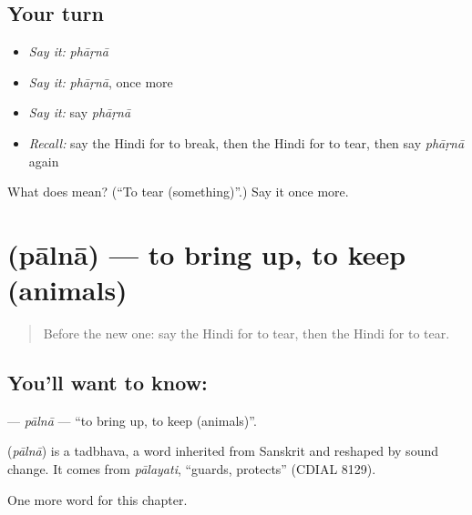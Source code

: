 \subsection*{Your turn}
\begin{itemize}
\raggedright
  \item \emph{Say it:} \emph{phāṛnā}
  \item \emph{Say it:} \emph{phāṛnā}, once more
  \item \emph{Say it:} say \emph{phāṛnā}
  \item \emph{Recall:} say the Hindi for to break, then the Hindi for to tear, then say \emph{phāṛnā} again
\end{itemize}

\begin{tcolorbox}[breakable,colback=teal!4,colframe=teal!35!black,title={Before you move on}]
What does  mean? (\textquotedblleft{}To tear (something)\textquotedblright{}.) Say it once more.
\end{tcolorbox}
\section[\texorpdfstring{\hi{पालना} (pālnā)}{पालना (pālnā)}]{ (pālnā) — to bring up, to keep (animals)}

\label{lesson:HI-C227-palna}



\begin{quote}
Before the new one: say the Hindi for to tear, then the Hindi for to tear.
\end{quote}

\subsection*{You'll want to know: }
\textbf{} — \emph{pālnā} — \textquotedblleft{}to bring up, to keep (animals)\textquotedblright{}.

\begin{cousinweb}
\textbf{} (\emph{pālnā}) is a tadbhava, a word inherited from Sanskrit and reshaped by sound change. It comes from \emph{pālayati}, \textquotedblleft{}guards, protects\textquotedblright{} (CDIAL 8129).
\end{cousinweb}

\begin{grammarlens}[title={What you've built}]
One more word for this chapter.
\end{grammarlens}

